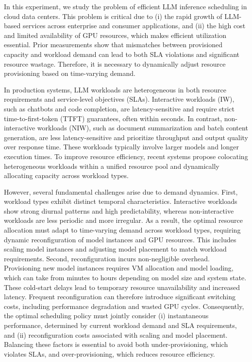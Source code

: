 In this experiment, we study the problem of efficient LLM inference scheduling in cloud data centers. This problem is critical due to (i) the rapid growth of LLM-based services across enterprise and consumer applications, and (ii) the high cost and limited availability of GPU resources, which makes efficient utilization essential. Prior measurements show that mismatches between provisioned capacity and workload demand can lead to both SLA violations and significant resource wastage. Therefore, it is necessary to dynamically adjust resource provisioning based on time-varying demand. 

In production systems, LLM workloads are heterogeneous in both resource requirements and service-level objectives (SLAs). Interactive workloads (IW), such as chatbots and code completion, are latency-sensitive and require strict time-to-first-token (TTFT) guarantees, often within seconds. In contrast, non-interactive workloads (NIW), such as document summarization and batch content generation, are less latency-sensitive and prioritize throughput and output quality over response time. These workloads typically involve larger models and longer execution times. To improve resource efficiency, recent systems propose colocating heterogeneous workloads within a unified resource pool and dynamically allocating capacity across workload types.

However, several fundamental challenges arise due to demand dynamics. First, workload types exhibit distinct temporal characteristics. Interactive workloads show strong diurnal patterns and high predictability, whereas non-interactive workloads are less periodic and more irregular. As a result, the optimal resource allocation must adapt to time-varying demand across workload types, requiring dynamic reconfiguration of model instances and GPU resources. This includes scaling model instances and adjusting model placement to match workload requirements. Second, reconfiguration incurs non-negligible overhead. Provisioning new model instances requires VM allocation and model loading, which can take from minutes to hours depending on model size and system state. These cold-start delays lead to temporary resource unavailability and increased latency. Frequent reconfiguration can therefore introduce significant switching costs, including performance degradation and wasted GPU cycles.
Consequently, the optimal scheduling policy must jointly consider (i) instantaneous performance, determined by current workload demand and SLA requirements, and (ii) reconfiguration costs associated with scaling and model placement. Balancing these factors is essential to avoid both under-provisioning, which violates SLAs, and over-provisioning, which reduces resource efficiency.


